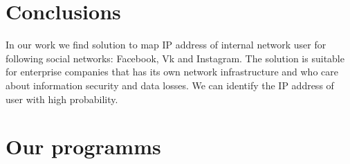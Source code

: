 \documentclass[12pt,a4paper]{report}
\begin{document}
\section{Conclusions}
In our work we find solution to map IP address of internal network user for following social networks: Facebook, Vk and Instagram. The solution is suitable for enterprise companies that has its own network infrastructure and who care about information security and data losses. We can identify the IP address of user with high probability.


\pagebreak
\section{Our programms}


\end{document}

